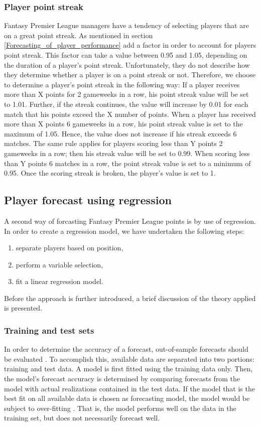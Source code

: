 \subsubsection{Player point streak}
Fantasy Premier League managers have a tendency of selecting players that are on a great point streak. As mentioned in section \ref{Forecasting_of_player_performance} \cite{Bonomo} add a factor in order to account for players point streak. This factor can take a value between 0.95 and 1.05, depending on the duration of a player's point streak. Unfortunately, they do not describe how they determine whether a player is on a point streak or not. Therefore, we choose to determine a player's point streak in the following way: 
\newpar
If a player receives more than X points for 2 gameweeks in a row, his point streak value will be set to 1.01. Further, if the streak continues, the value will increase by 0.01 for each match that his points exceed the X number of points. When a player has received more than X points 6 gameweeks in a row, his point streak value is set to the maximum of 1.05. Hence, the value does not increase if his streak exceeds 6 matches. The same rule applies for players scoring less than Y points 2 gameweeks in a row; then his streak value will be set to 0.99. When scoring less than Y points 6 matches in a row, the point streak value is set to a minimum of 0.95. Once the scoring streak is broken, the player's value is set to 1. 


\subsection{Player forecast using regression}
\label{Sol_approach_regression}

A second way of forcasting Fantasy Premier League points is by use of regression. In order to create a regression model, we have undertaken the following steps:
\begin{enumerate} [label=(\roman*)]
    \item separate players based on position,
    \item perform a variable selection,
    \item fit a linear regression model.
\end{enumerate}
Before the approach is further introduced, a brief discussion of the theory applied is presented.


\subsubsection{Training and test sets}
In order to determine the accuracy of a forecast, out-of-sample forecasts should be evaluated \citep{Hyndman}. To accomplish this, available data are separated into two portions: training and test data. A model is first fitted using the training data only. Then, the model's forecast accuracy is determined by comparing forecasts from the model with actual realizations contained in the test data. 
If the model that is the best fit on all available data is chosen as forecasting model, the model would be subject to over-fitting \citep{Hyndman}. That is, the model performs well on the data in the training set, but does not necessarily forecast well.

